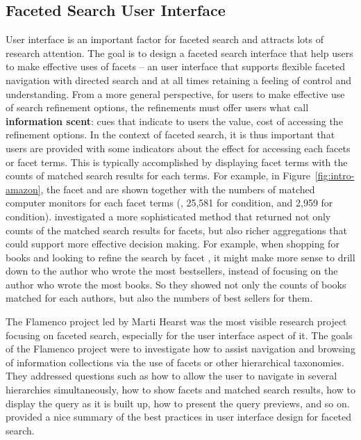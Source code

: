 \subsection{Faceted Search User Interface}
User interface is an important factor for faceted search and attracts lots of research attention. The goal is to design a faceted search interface that help users to make effective uses of facets -- an user interface that supports flexible faceted navigation with directed search and at all times retaining a feeling of control and understanding. From a more general perspective, for users to make effective use of search refinement options, the refinements must offer users what \citet{pirolli2000effect} call \textbf{information scent}: cues that indicate to users the value, cost of accessing the refinement options. In the context of faceted search, it is thus important that users are provided with some indicators about the effect for accessing each facets or facet terms. This is typically accomplished by displaying facet terms with the counts of matched search results for each terms. For example, in Figure~\ref{fig:intro-amazon}, the facet  and  are shown together 
with the numbers of matched computer monitors for each facet terms (\eg, 25,581 for  condition, and 2,959 for  condition). \citet{ben2008beyond} investigated a more sophisticated method that returned not only counts of the matched search results for facets, but also richer aggregations that could support more effective decision making. For example, when shopping for books and looking to refine the search by facet , it might make more sense to drill down to the author who wrote the most bestsellers, instead of focusing on the author who wrote the most books. So they showed not only the counts of books matched for each authors, but also the numbers of best sellers for them.

The Flamenco project led by Marti Hearst was the most visible research project focusing on faceted search, especially for the user interface aspect of it. The goals of the Flamenco project were to investigate how to assist navigation and browsing of information collections via the use of facets or other hierarchical taxonomies. They addressed questions such as how to allow the user to navigate in several hierarchies simultaneously, how to show facets and matched search results, how to display the query as it is built up, how to present the query previews, and so on. \citet{hearst2006design} provided a nice summary of the best practices in user interface design for faceted search.

